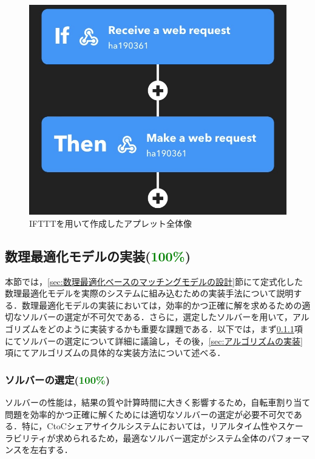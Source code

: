       \begin{figure}[htbp]
        \centering
        \includegraphics[scale=0.27]
        {figures/IFTTT-overall.jpg}
        \caption{IFTTTを用いて作成したアプレット全体像}
        \label{fig:IFTTTを用いて作成したアプレット全体像}
      \end{figure}
          
  \subsection{数理最適化モデルの実装(\textcolor{green}{100\%})}
    \label{sec:数理最適化モデルの実装}
      \par 本節では，\ref{sec:数理最適化ベースのマッチングモデルの設計}節にて定式化した数理最適化モデルを実際のシステムに組み込むための実装手法について説明する．数理最適化モデルの実装においては，効率的かつ正確に解を求めるための適切なソルバーの選定が不可欠である．さらに，選定したソルバーを用いて，アルゴリズムをどのように実装するかも重要な課題である．以下では，まず\ref{sec:ソルバーの選定}項にてソルバーの選定について詳細に議論し，その後，\ref{sec:アルゴリズムの実装}項にてアルゴリズムの具体的な実装方法について述べる．
      
      \subsubsection{ソルバーの選定(\textcolor{green}{100\%})}
        \label{sec:ソルバーの選定}
          \par ソルバーの性能は，結果の質や計算時間に大きく影響するため，自転車割り当て問題を効率的かつ正確に解くためには適切なソルバーの選定が必要不可欠である．特に，CtoCシェアサイクルシステムにおいては，リアルタイム性やスケーラビリティが求められるため，最適なソルバー選定がシステム全体のパフォーマンスを左右する．
          
